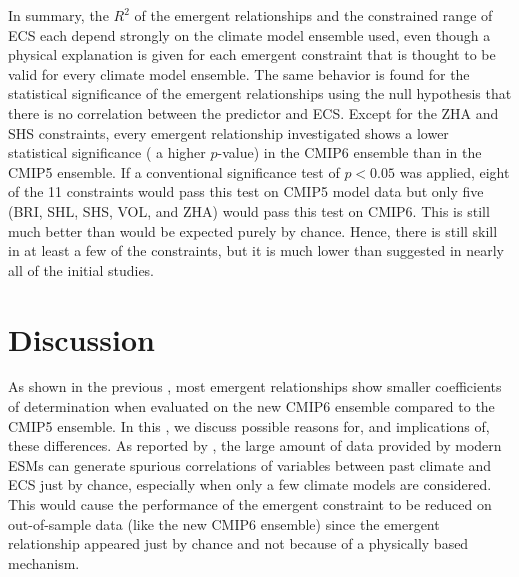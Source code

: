 In summary, the $R^2$ of the emergent relationships and the constrained range
of \ac{ECS} each depend strongly on the climate model ensemble used, even
though a physical explanation is given for each emergent constraint that is
thought to be valid for every climate model ensemble. The same behavior is
found for the statistical significance of the emergent relationships using the
null hypothesis that there is no correlation between the predictor and
\ac{ECS}. Except for the ZHA and SHS constraints, every emergent relationship
investigated shows a lower statistical significance (\ie{} a higher $p$-value)
in the \acs{CMIP}6 ensemble than in the \acs{CMIP}5 ensemble. If a conventional
significance test of $p < 0.05$ was applied, eight of the 11 constraints would
pass this test on \acs{CMIP}5 model data but only five (BRI, SHL, SHS, VOL, and
ZHA) would pass this test on \acs{CMIP}6. This is still much better than would
be expected purely by chance. Hence, there is still skill in at least a few of
the constraints, but it is much lower than suggested in nearly all of the
initial studies.


\section{Discussion}
\label{sec:05:discussion}

As shown in the previous
, most emergent
relationships show smaller coefficients of determination when evaluated on the
new \acs{CMIP}6 ensemble compared to the \acs{CMIP}5 ensemble. In this
, we discuss possible reasons for, and
implications of, these differences. As reported by \textcite{Caldwell2014}, the
large amount of data provided by modern \acp{ESM} can generate spurious
correlations of variables between past climate and \ac{ECS} just by chance,
especially when only a few climate models are considered. This would cause the
performance of the emergent constraint to be reduced on out-of-sample data
(like the new \acs{CMIP}6 ensemble) since the emergent relationship appeared
just by chance and not because of a physically based mechanism.

